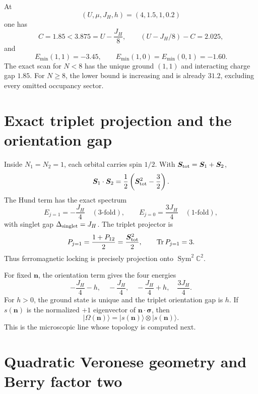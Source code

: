 \documentclass[11pt]{article}
\theoremstyle{definition}
\theoremstyle{remark}
\newcommand{\CC}{\mathbb{C}}
\newcommand{\Tr}{\operatorname{Tr}}
\newcommand{\Sym}{\operatorname{Sym}}
\newcommand{\ket}[1]{\lvert #1\rangle}
\begin{document}
At
\begin{equation}
 (U,\mu,J_H,h)=(4,1.5,1,0.2)
 \label{eq:benchmark}
\end{equation}
one has
\[
 C=1.85<3.875=U-\frac{J_H}{8},\qquad
 (U-J_H/8)-C=2.025,
\]
and
\[
 E_{\min}(1,1)=-3.45,\qquad
 E_{\min}(1,0)=E_{\min}(0,1)=-1.60.
\]
The exact scan for \(N<8\) has the unique ground \((1,1)\) and interacting
charge gap \(1.85\).  For \(N\ge8\), the lower bound is increasing and is
already \(31.2\), excluding every omitted occupancy sector.

\section{Exact triplet projection and the orientation gap}

Inside \(N_1=N_2=1\), each orbital carries spin \(1/2\).  With
\(\bm S_{\rm tot}=\bm S_1+\bm S_2\),
\begin{equation}
 \bm S_1\cdot\bm S_2
 =\frac12\left(\bm S_{\rm tot}^2-\frac32\right).
 \label{eq:spin-addition}
\end{equation}
The Hund term has the exact spectrum
\begin{equation}
 E_{j=1}=-\frac{J_H}{4}\quad(3\text{-fold}),\qquad
 E_{j=0}=\frac{3J_H}{4}\quad(1\text{-fold}),
 \label{eq:hund-spectrum}
\end{equation}
with singlet gap \(\Delta_{\rm singlet}=J_H\).  The triplet projector is
\begin{equation}
 P_{j=1}=\frac{1+P_{12}}{2}=\frac{\bm S_{\rm tot}^2}{2},
 \qquad \Tr P_{j=1}=3.
 \label{eq:triplet-projector}
\end{equation}
Thus ferromagnetic locking is precisely projection onto \(\Sym^2\CC^2\).

For fixed \(\bm n\), the orientation term gives the four energies
\begin{equation}
 -\frac{J_H}{4}-h,\quad -\frac{J_H}{4},\quad
 -\frac{J_H}{4}+h,\quad \frac{3J_H}{4}.
 \label{eq:probe-spectrum}
\end{equation}
For \(h>0\), the ground state is unique and the triplet orientation gap is
\(h\).  If \(s(\bm n)\) is the normalized \(+1\) eigenvector of
\(\bm n\cdot\bm\sigma\), then
\begin{equation}
 \ket{\Omega(\bm n)}=\ket{s(\bm n)}\otimes\ket{s(\bm n)}.
 \label{eq:pair-ground}
\end{equation}
This is the microscopic line whose topology is computed next.

\section{Quadratic Veronese geometry and Berry factor two}
\end{document}
